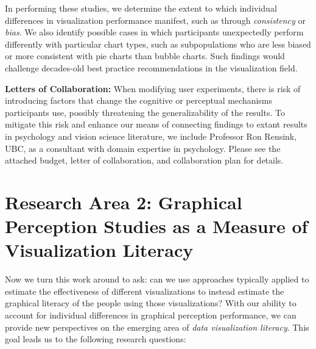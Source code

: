 \documentclass[11pt]{article}
\begin{document}
In performing these studies, we determine the extent to which individual differences in visualization performance manifest, such as through \emph{consistency} or \emph{bias}. We also identify possible cases in which participants unexpectedly perform differently with particular chart types, such as subpopulations who are less biased or more consistent with pie charts than bubble charts. 
Such findings would challenge decades-old best practice recommendations in the visualization field.

\noindent\textbf{Letters of Collaboration:} 
When modifying user experiments, there is risk of introducing factors that change the cognitive or perceptual mechanisms participants use, possibly threatening the generalizability of the results. 
To mitigate this risk and enhance our means of connecting findings to extant results in psychology and vision science literature, we include Professor Ron Rensink, UBC, as a consultant with domain expertise in psychology.
Please see the attached budget, letter of collaboration, and collaboration plan for details.


\section{Research Area 2: Graphical Perception Studies as a Measure of Visualization Literacy}

Now we turn this work around to ask: can we use approaches typically applied to estimate the effectiveness of different visualizations to instead estimate the graphical literacy of the people using those visualizations?
With our ability to account for individual differences in graphical perception performance, we can provide new perspectives on the emerging area of \emph{data visualization literacy}.
This goal leads us to the following research questions:

\noindent\hrulefill
\end{document}
